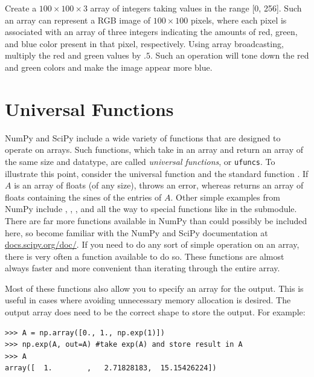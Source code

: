 \begin{problem}
Create a $100\times100\times3$ array of integers taking values in the range 
[0, 256]. Such an array can represent a RGB image of $100\times100$ pixels, 
where each pixel is associated with an array of three integers indicating the 
amounts of red, green, and blue color present in that pixel, respectively.
Using array broadcasting, multiply the red and green values by $.5$. 
Such an operation will tone down the red and green colors and make the 
image appear more blue.
\end{problem}

\section*{Universal Functions}
NumPy and SciPy include a wide variety of functions that are designed to 
operate on arrays. Such functions, which take in an array and return an array 
of the same size and datatype, are called \emph{universal functions}, or 
\texttt{ufuncs}. To illustrate this point, consider the universal function 
 and the standard function . If $A$ is an array 
of floats (of any size),  throws an error, whereas 
 returns an array of floats containing the sines of the 
entries of $A$. Other simple examples from NumPy include , , 
, and  all the way to special functions like  
in the  submodule. There are far more functions available in 
NumPy than could possibly be included here, so become 
familiar with the NumPy and SciPy documentation at \url{docs.scipy.org/doc/}.
If you need to do any sort of simple operation on an array, there is very 
often a function available to do so. These functions are almost always faster and 
more convenient than iterating through the entire array.

Most of these functions also allow you to specify an array for the output.
This is useful in cases where avoiding unnecessary memory 
allocation is desired. The output array does need to be the correct shape 
to store the output.
For example:

\begin{lstlisting}
>>> A = np.array([0., 1., np.exp(1)])
>>> np.exp(A, out=A) #take exp(A) and store result in A
>>> A
array([  1.        ,   2.71828183,  15.15426224])
\end{lstlisting}

